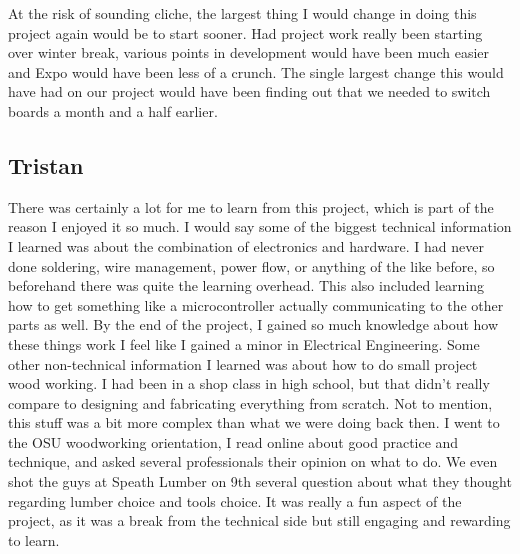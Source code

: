 \documentclass[onecolumn, draftclsnofoot,10pt, compsoc]{IEEEtran}
\begin{document}
At the risk of sounding cliche, the largest thing I would change in doing this project again would be to start sooner.
Had project work really been starting over winter break, various points in development would have been much easier and Expo would have been less of a crunch.
The single largest change this would have had on our project would have been finding out that we needed to switch boards a month and a half earlier.


\subsection{Tristan}
There was certainly a lot for me to learn from this project, which is part of the reason I enjoyed it so much.
I would say some of the biggest technical information I learned was about the combination of electronics and hardware.
I had never done soldering, wire management, power flow, or anything of the like before, so beforehand there was quite the learning overhead.
This also included learning how to get something like a microcontroller actually communicating to the other parts as well.
By the end of the project, I gained so much knowledge about how these things work I feel like I gained a minor in Electrical Engineering.
Some other non-technical information I learned was about how to do small project wood working.
I had been in a shop class in high school, but that didn't really compare to designing and fabricating everything from scratch.
Not to mention, this stuff was a bit more complex than what we were doing back then.
I went to the OSU woodworking orientation, I read online about good practice and technique, and asked several professionals their opinion on what to do.
We even shot the guys at Speath Lumber on 9th several question about what they thought regarding lumber choice and tools choice.
It was really a fun aspect of the project, as it was a break from the technical side but still engaging and rewarding to learn.
\end{document}
